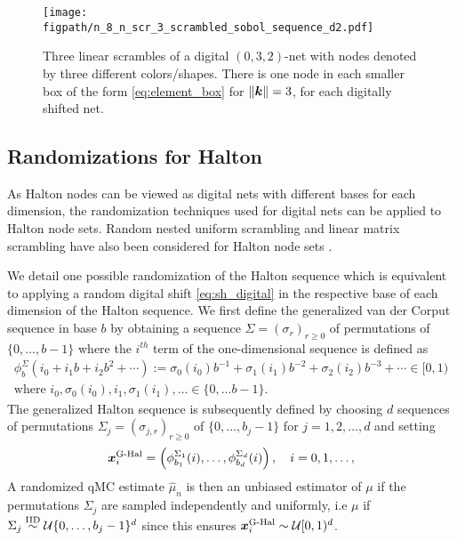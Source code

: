 \documentclass{svproc}
\newcommand{\AGSNote}[1]{{\textcolor{blue}{Aleksei: #1}}}
\newcommand{\figpath}{Figures}
\begin{document}
\begin{figure}
	\centering
	\texttt{[image: \\figpath/n\_8\_n\_scr\_3\_scrambled\_sobol\_sequence\_d2.pdf]}
	\caption{Three linear scrambles of a digital $(0,3,2)$-net with nodes denoted by three different colors/shapes.  There is one node in each smaller box of the form \eqref{eq:element_box} for $\lVert {\boldsymbol{k}} \rVert = 3$, for each digitally shifted net. \label{fig:scrambled_net}}
\end{figure}

\subsection{Randomizations for Halton}\label{sec:randHalton}


As Halton nodes can be viewed as digital nets with different bases for each dimension, the randomization techniques used for digital nets can be applied to Halton node sets. Random nested uniform scrambling and linear matrix scrambling have also been considered for Halton node sets \cite{owen2024gain}.

We detail one possible randomization of the Halton sequence which is equivalent to applying a random digital shift \eqref{eq:sh_digital} in the respective base of each dimension of the Halton sequence. We first define the generalized van der Corput sequence in base $b$ by obtaining a sequence $\Sigma = (\sigma_r)_{r\geq0}$ of permutations of $\{0,\ldots,b-1\}$ where the $i^{th}$ term of the one-dimensional sequence is defined as 
\begin{multline}\label{eq:gen_vdc}
    \phi_b^{\Sigma}(i_0 + i_1b + i_2 b^2 + \cdots ) := \sigma_0(i_0) b^{-1} + \sigma_1(i_1) b^{-2} + \sigma_2(i_2) b^{-3} + \cdots \in [0,1)
	\\
	 \text{where } i_0, \sigma_0(i_0), i_1, \sigma_1(i_1), \ldots \in \{0,\ldots b-1\}.
\end{multline}
The generalized Halton sequence is subsequently defined by choosing $d$ sequences of permutations $\Sigma_j = (\sigma_{j,r})_{r\geq0}$ of $\{0,\ldots,b_j-1\}$ for $j = 1, 2,\ldots,d$ and setting
$${\boldsymbol{x}}_i^{\text{G-Hal}} = \left( \phi^{\Sigma_1}_{b_1}(i), \ldots, \phi^{\Sigma_d}_{b_d}(i)\right), \quad i= 0,1,\ldots,$$ A randomized qMC estimate $\hat{\mu}_n$ is then an unbiased estimator of $\mu$ if the permutations $\Sigma_j$ are sampled independently and uniformly, i.e $\mu$ if $\Sigma_j \overset{\text{IID}}{\sim} {\mathcal{U}}\{0,\dots,b_j-1\}^d$ since this ensures ${\boldsymbol{x}}_i^{\text{G-Hal}} \sim \mathcal{U}[0,1)^d$. 
\end{document}
